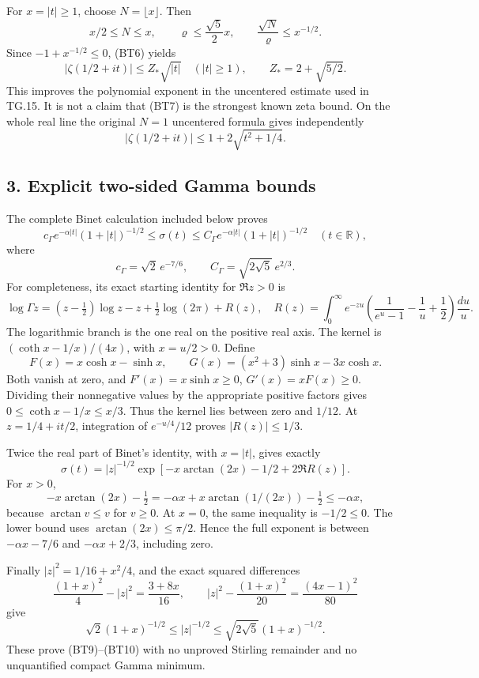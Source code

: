 For \(x=|t|\ge1\), choose \(N=\lfloor x\rfloor\). Then \[
x/2\le N\le x,\qquad
\varrho\le\frac{\sqrt5}{2}x,\qquad
\frac{\sqrt N}{\varrho}\le x^{-1/2}.
\] Since \(-1+x^{-1/2}\le0\), (BT6) yields \[
\boxed{|\zeta(1/2+it)|\le Z_*\sqrt{|t|}\quad(|t|\ge1),
\qquad Z_*=2+\sqrt{5/2}.}
\tag{BT7}
\] This improves the polynomial exponent in the uncentered estimate used in TG.15. It is not a claim that (BT7) is the strongest known zeta bound. On the whole real line the original \(N=1\) uncentered formula gives independently \[
|\zeta(1/2+it)|\le 1+2\sqrt{t^2+1/4}.
\tag{BT8}
\]

\subsection{3. Explicit two-sided Gamma bounds}\label{bt:explicit-two-sided-gamma-bounds}

The complete Binet calculation included below proves \[
\boxed{
c_\Gamma e^{-\alpha|t|}(1+|t|)^{-1/2}
\le \sigma(t)\le
C_\Gamma e^{-\alpha|t|}(1+|t|)^{-1/2}
\quad(t\in\mathbb R),}
\tag{BT9}
\] where \[
c_\Gamma=\sqrt2\,e^{-7/6},\qquad
C_\Gamma=\sqrt{2\sqrt5}\,e^{2/3}.
\tag{BT10}
\] For completeness, its exact starting identity for \(\Re z>0\) is \[
\log\Gamma z=(z-\tfrac12)\log z-z+\tfrac12\log(2\pi)+R(z),
\quad
R(z)=\int_0^\infty e^{-zu}
 \left(\frac1{e^u-1}-\frac1u+\frac12\right)\frac{du}{u}.
\] The logarithmic branch is the one real on the positive real axis. The kernel is \((\coth x-1/x)/(4x)\), with \(x=u/2>0\). Define \[
F(x)=x\cosh x-\sinh x,\qquad
G(x)=(x^2+3)\sinh x-3x\cosh x.
\] Both vanish at zero, and \(F'(x)=x\sinh x\ge0\), \(G'(x)=xF(x)\ge0\). Dividing their nonnegative values by the appropriate positive factors gives \(0\le\coth x-1/x\le x/3\). Thus the kernel lies between zero and \(1/12\). At \(z=1/4+it/2\), integration of \(e^{-u/4}/12\) proves \(|R(z)|\le1/3\).

Twice the real part of Binet's identity, with \(x=|t|\), gives exactly \[
\sigma(t)=|z|^{-1/2}
 \exp[-x\arctan(2x)-1/2+2\Re R(z)].
\] For \(x>0\), \[
-x\arctan(2x)-\tfrac12
=-\alpha x+x\arctan(1/(2x))-\tfrac12
\le-\alpha x,
\] because \(\arctan v\le v\) for \(v\ge0\). At \(x=0\), the same inequality is \(-1/2\le0\). The lower bound uses \(\arctan(2x)\le\pi/2\). Hence the full exponent is between \(-\alpha x-7/6\) and \(-\alpha x+2/3\), including zero.

Finally \(|z|^2=1/16+x^2/4\), and the exact squared differences \[
\frac{(1+x)^2}{4}-|z|^2=\frac{3+8x}{16},\qquad
|z|^2-\frac{(1+x)^2}{20}=\frac{(4x-1)^2}{80}
\] give \[
\sqrt2(1+x)^{-1/2}\le |z|^{-1/2}
\le\sqrt{2\sqrt5}(1+x)^{-1/2}.
\] These prove (BT9)--(BT10) with no unproved Stirling remainder and no unquantified compact Gamma minimum.

